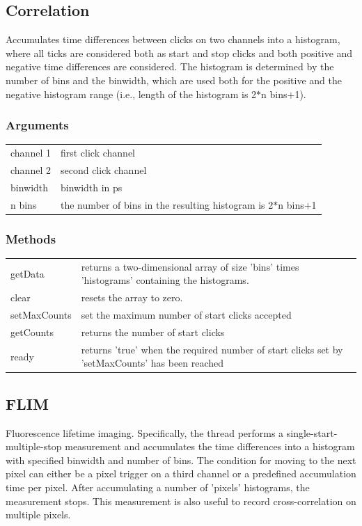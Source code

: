 \documentclass[oneside]{memoir}
\begin{document}
\subsection[*]{Correlation}

Accumulates time differences between clicks on two channels into
a histogram, where all ticks are considered both as start and stop
clicks and both positive and negative time differences are considered.
The histogram is determined by the number of bins and the binwidth, which
are used both for the positive and the negative histogram range (i.e.,
length of the histogram is 2$*$n bins$+$1).

\subsubsection{Arguments}
\begin{tabular}{p{}p{}}
  channel 1 & first click channel\\
  channel 2 & second click channel\\
  binwidth & binwidth in ps\\
  n bins & the number of bins in the resulting histogram is 2$*$n bins$+$1\\
\end{tabular}
\subsubsection{Methods}
\begin{tabular}{p{}p{}}
  getData & returns a two-dimensional array of size 'bins' times 'histograms' containing the histograms.\\
  clear & resets the array to zero.\\
  setMaxCounts & set the maximum number of start clicks accepted\\
  getCounts & returns the number of start clicks\\
  ready & returns 'true' when the required number of start clicks set by 'setMaxCounts' has been reached\\
\end{tabular}


\subsection[*]{FLIM}

Fluorescence lifetime imaging. Specifically, the thread performs a single-start-multiple-stop measurement
and accumulates the time differences into a histogram with specified binwidth and number of bins. The condition
for moving to the next pixel can either be a pixel trigger on a third channel or a predefined accumulation
time per pixel. After accumulating a number of 'pixels' histograms, the measurement stops. This measurement
is also useful to record cross-correlation on multiple pixels.
\end{document}
